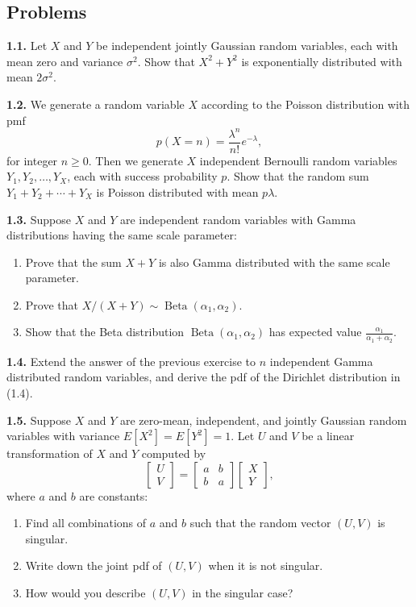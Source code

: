 \subsection*{Problems}

\textbf{1.1.} Let $X$ and $Y$ be independent jointly Gaussian random variables, each with mean zero and variance $\sigma^2$. Show that $X^2+Y^2$ is exponentially distributed with mean $2\sigma^2$.

\textbf{1.2.} We generate a random variable $X$ according to the Poisson distribution with pmf
\[
p(X=n)=\frac{\lambda^n}{n!}e^{-\lambda},
\]
for integer $n\ge 0$. Then we generate $X$ independent Bernoulli random variables $Y_1,Y_2,\dots,Y_X$, each with success probability $p$. Show that the random sum $Y_1+Y_2+\cdots+Y_X$ is Poisson distributed with mean $p\lambda$.

\textbf{1.3.} Suppose $X$ and $Y$ are independent random variables with Gamma distributions having the same scale parameter:
\begin{enumerate}[label=(\alph*)]
    \item Prove that the sum $X+Y$ is also Gamma distributed with the same scale parameter.
    \item Prove that $X/(X+Y)\sim \operatorname{Beta}(\alpha_1,\alpha_2)$.
    \item Show that the Beta distribution $\operatorname{Beta}(\alpha_1,\alpha_2)$ has expected value $\frac{\alpha_1}{\alpha_1+\alpha_2}$.
\end{enumerate}

\textbf{1.4.} Extend the answer of the previous exercise to $n$ independent Gamma distributed random variables, and derive the pdf of the Dirichlet distribution in (1.4).

\textbf{1.5.} Suppose $X$ and $Y$ are zero-mean, independent, and jointly Gaussian random variables with variance $E[X^2]=E[Y^2]=1$. Let $U$ and $V$ be a linear transformation of $X$ and $Y$ computed by
\[
\begin{bmatrix}
U\\
V
\end{bmatrix}
=
\begin{bmatrix}
a & b\\
b & a
\end{bmatrix}
\begin{bmatrix}
X\\
Y
\end{bmatrix},
\]
where $a$ and $b$ are constants:
\begin{enumerate}[label=(\alph*)]
    \item Find all combinations of $a$ and $b$ such that the random vector $(U,V)$ is singular.
    \item Write down the joint pdf of $(U,V)$ when it is not singular.
    \item How would you describe $(U,V)$ in the singular case?
\end{enumerate}

